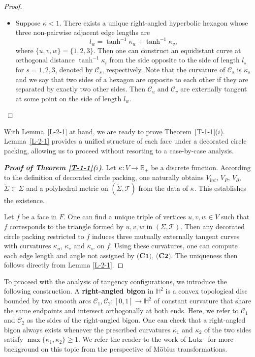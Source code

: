 \documentclass[11pt,leqno]{article}
\numberwithin{equation}{section}
\theoremstyle{definition}
\begin{document}
\begin{proof}
\begin{itemize}
\item[($c$)] Suppose $\kappa<1$.  There exists a unique right-angled hyperbolic hexagon whose three non-pairwise adjacent edge lengths are
    \[l_w=\tanh^{-1}\kappa_u+\tanh^{-1}\kappa_v,\]
    where $\{u,v,w\}=\{1,2,3\}$.
    Then one can construct an equidistant curve at orthogonal distance $\tanh^{-1}\kappa_i$ from the side opposite to the side of length $l_s$ for $s=1,2,3$, denoted by $\mathcal C_s$, respectively. Note that the curvature of $\mathcal C_s$ is $\kappa_s$ and we say that two sides of a hexagon are opposite to each other if they are separated by exactly two other sides. Then $\mathcal C_u$ and $\mathcal C_v$ are externally tangent at some point on the side of length $l_w$.



\end{itemize}


\end{proof}
With Lemma~\ref{L-2-1} at hand, we are ready to prove Theorem~\ref{T-1-1}($i$).
Lemma~\ref{L-2-1} provides a unified structure of each face under a decorated circle packing, allowing us to proceed without resorting to a case-by-case analysis.
\begin{proof}[\textbf{Proof of Theorem \ref{T-1-1}($i$)}]
Let $\kappa:V\to\mathbb{R}_+$ be a discrete function.
According to the definition of decorated circle packing, one naturally obtains $V_{\mathrm int}$,  $V_P$, $V_\partial$, $\widetilde\Sigma\subset\Sigma$ and a polyhedral metric on $(\widetilde\Sigma,\mathcal T)$ from the data of $\kappa$.
This establishes the existence.

Let $f$ be a face in $F$. One can find a unique triple of vertices $u,v,w\in V$ such that $f$ corresponds to the triangle formed by $u,v,w$ in $(\Sigma,\mathcal T)$.
Then any decorated circle packing restricted to $f$ induces three mutually externally tangent curves with curvatures $\kappa_u$, $\kappa_v$ and $\kappa_w$ on $f$. Using these curvatures, one can compute each edge length and angle not assigned by $\textbf{(C1)}$, $\textbf{(C2)}$. The uniqueness then follows directly from Lemma \ref{L-2-1}.
\end{proof}
To proceed with the analysis of tangency configurations, we introduce the following construction.
A \textbf{right-angled bigon} in $\mathbb{H}^2$ is a convex topological disc bounded by two smooth arcs $\mathcal{C}_1, \mathcal{C}_2 : [0,1] \to \mathbb{H}^2$ of constant curvature that share the same endpoints and intersect orthogonally at both ends. Here, we refer to $\mathcal{C}_1$ and $\mathcal{C}_2$ as the sides of the right-angled bigon.
One can check that a right-angled bigon always exists whenever the prescribed curvatures $\kappa_1$ and $\kappa_2$ of the two sides satisfy $\max\{\kappa_1, \kappa_2\} \geq 1$.
We refer the reader to the work of Lutz~\cite{MR4523869} for more background on this topic from the perspective of M\"obius transformations.
\end{document}
